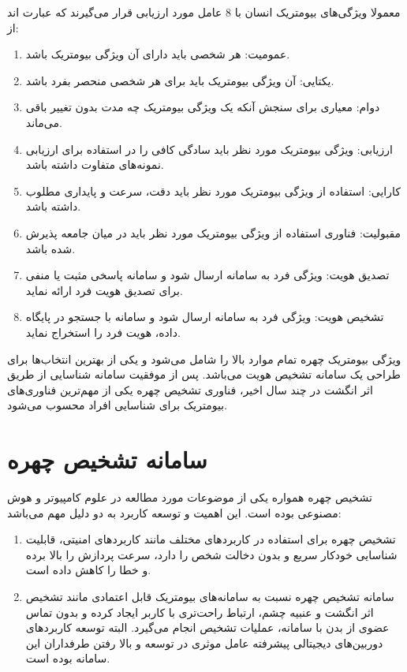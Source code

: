 معمولا ویژگی‌های بیومتریک انسان با 8 عامل مورد ارزیابی قرار می‌گیرند \cite{Biometrics} که عبارت اند از:
\begin{enumerate}
\item
 عمومیت: هر شخصی باید دارای آن ویژگی بیومتریک باشد.
 \item
 یکتایی: آن ویژگی بیومتریک باید برای هر شخصی منحصر بفرد باشد.
 \item
 دوام: معیاری برای سنجش آنکه یک ویژگی بیومتریک چه مدت بدون تغییر باقی می‌ماند.
 \item
 ارزیابی: ویژگی بیومتریک مورد نظر باید سادگی کافی را در استفاده برای ارزیابی نمونه‌های متفاوت داشته باشد.
 \item
 کارایی: استفاده از ویژگی بیومتریک مورد نظر باید دقت، سرعت و پایداری مطلوب داشته باشد.
 \item
 مقبولیت: فناوری استفاده از ویژگی بیومتریک مورد نظر باید در میان جامعه پذیرش شده باشد.
 \item
 تصدیق هویت: ویژگی فرد به سامانه ارسال شود و سامانه پاسخی مثبت یا منفی برای تصدیق هویت فرد ارائه نماید.
 \item
 تشخیص هویت: ویژگی فرد به سامانه ارسال ‌شود و سامانه با جستجو در پایگاه داده، هویت فرد را استخراج نماید.
\end{enumerate} 

\noindent
ویژگی بیومتریک چهره تمام موارد بالا را شامل می‌شود و یکی از بهترین انتخاب‌ها برای طراحی یک سامانه تشخیص هویت می‌باشد. پس از موفقیت سامانه شناسایی از طریق اثر انگشت در چند سال اخیر، فناوری تشخیص چهره یکی از مهم‌ترین فناوری‌های بیومتریک برای شناسایی افراد محسوب می‌شود.

\section{سامانه تشخیص چهره}

تشخیص چهره همواره یکی از موضوعات مورد مطالعه در علوم کامپیوتر و هوش مصنوعی بوده است.  این اهمیت و توسعه کاربرد به دو دلیل مهم می‌باشد:

\begin{enumerate}
\item
	تشخیص چهره برای استفاده در کاربردهای مختلف مانند کاربرد‌های امنیتی، قابلیت شناسایی خودکار سریع و بدون دخالت شخص را دارد، سرعت پردازش را بالا برده و خطا را کاهش داده است.
\item 
سامانه تشخیص چهره نسبت به سامانه‌های بیومتریک قابل اعتمادی مانند تشخیص اثر انگشت و عنبیه چشم، ارتباط راحت‌تری با کاربر ایجاد کرده و بدون تماس عضوی از بدن با سامانه، عملیات تشخیص انجام می‌گیرد. البته توسعه کاربردهای دوربین‌های دیجیتالی پیشرفته عامل موثری در توسعه و بالا رفتن طرفداران این سامانه بوده است.
\end{enumerate}

